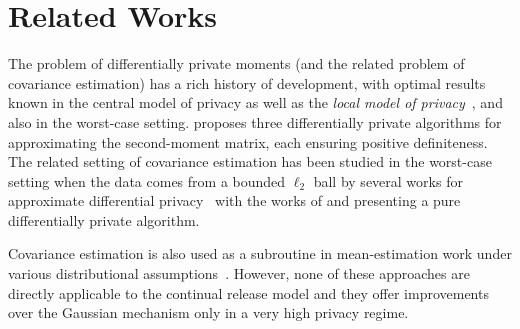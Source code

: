 \section{Related Works}
The problem of differentially private moments (and the related problem of covariance estimation) has a rich history of development, with optimal results known in the central model of privacy \citep{smith2011privacy} as well as the \emph{local model of privacy}~\citep{duchi2013local}, and also in the worst-case setting. \citet{dp_covariance_wishart_dist} proposes three differentially private algorithms for approximating the second-moment matrix, each ensuring positive definiteness. The related setting of covariance estimation has been studied in the worst-case setting when the data comes from a bounded $\ell_2$ ball by several works for approximate differential privacy~\citep{achlioptas2007fast, blum2005practical, dwork2014analyze, mangoubi2022re,mangoubi2023private,upadhyay2018price} with the works of \citet{dp_covariance} and \citet{kapralov2013differentially} presenting a pure differentially private algorithm. %

Covariance estimation is also used as a subroutine in mean-estimation work under various distributional assumptions~\citep{kamath2024broader}.  %
However, none of these approaches are directly applicable to the continual release model 
and they offer improvements over the Gaussian mechanism only in a very high privacy regime.
